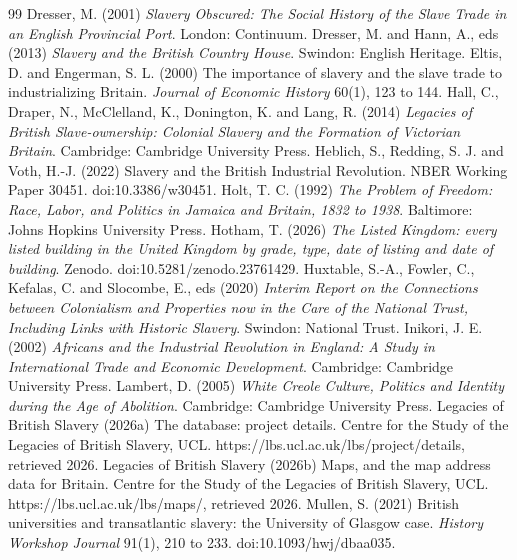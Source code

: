 \documentclass[11pt,a4paper]{article}
\begin{document}
\begin{thebibliography}{99}
 Dresser, M. (2001) \textit{Slavery Obscured: The Social History of the Slave Trade in an English Provincial Port}. London: Continuum.
 Dresser, M. and Hann, A., eds (2013) \textit{Slavery and the British Country House}. Swindon: English Heritage.
 Eltis, D. and Engerman, S. L. (2000) The importance of slavery and the slave trade to industrializing Britain. \textit{Journal of Economic History} 60(1), 123 to 144.
 Hall, C., Draper, N., McClelland, K., Donington, K. and Lang, R. (2014) \textit{Legacies of British Slave-ownership: Colonial Slavery and the Formation of Victorian Britain}. Cambridge: Cambridge University Press.
 Heblich, S., Redding, S. J. and Voth, H.-J. (2022) Slavery and the British Industrial Revolution. NBER Working Paper 30451. doi:10.3386/w30451.
 Holt, T. C. (1992) \textit{The Problem of Freedom: Race, Labor, and Politics in Jamaica and Britain, 1832 to 1938}. Baltimore: Johns Hopkins University Press.
 Hotham, T. (2026) \textit{The Listed Kingdom: every listed building in the United Kingdom by grade, type, date of listing and date of building}. Zenodo. doi:10.5281/zenodo.23761429.
 Huxtable, S.-A., Fowler, C., Kefalas, C. and Slocombe, E., eds (2020) \textit{Interim Report on the Connections between Colonialism and Properties now in the Care of the National Trust, Including Links with Historic Slavery}. Swindon: National Trust.
 Inikori, J. E. (2002) \textit{Africans and the Industrial Revolution in England: A Study in International Trade and Economic Development}. Cambridge: Cambridge University Press.
 Lambert, D. (2005) \textit{White Creole Culture, Politics and Identity during the Age of Abolition}. Cambridge: Cambridge University Press.
 Legacies of British Slavery (2026a) The database: project details. Centre for the Study of the Legacies of British Slavery, UCL. https://lbs.ucl.ac.uk/lbs/project/details, retrieved 2026.
 Legacies of British Slavery (2026b) Maps, and the map address data for Britain. Centre for the Study of the Legacies of British Slavery, UCL. https://lbs.ucl.ac.uk/lbs/maps/, retrieved 2026.
 Mullen, S. (2021) British universities and transatlantic slavery: the University of Glasgow case. \textit{History Workshop Journal} 91(1), 210 to 233. doi:10.1093/hwj/dbaa035.

\end{thebibliography}
\end{document}
